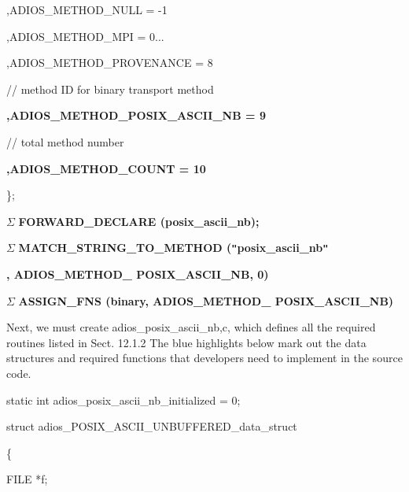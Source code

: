 \vspace{10pt}
\parindent=75pt
,ADIOS\_METHOD\_NULL                 = -1

\vspace{10pt}
,ADIOS\_METHOD\_MPI                    = 0...

\vspace{23pt}
\parindent=226pt
,ADIOS\_METHOD\_PROVENANCE  = 8

\vspace{10pt}
\parindent=0pt
// method ID for binary transport method

\vspace{10pt}
\parindent=75pt
\textbf{,ADIOS\_METHOD\_POSIX\_ASCII\_NB  = 9 }

\vspace{10pt}
// total method number

\vspace{10pt}
\textbf{,ADIOS\_METHOD\_COUNT  = 10 }

\vspace{10pt}
\};

\vspace{10pt}
\parindent=0pt
\ensuremath{\Sigma} \textbf{FORWARD\_DECLARE (posix\_ascii\_nb);}

\vspace{23pt}
\ensuremath{\Sigma} \textbf{MATCH\_STRING\_TO\_METHOD (\texttt{"}posix\_ascii\_nb\texttt{"}}

\vspace{10pt}
\textbf{, ADIOS\_METHOD\_ POSIX\_ASCII\_NB, 0)}

\vspace{10pt}
\ensuremath{\Sigma} \textbf{ASSIGN\_FNS (binary, ADIOS\_METHOD\_ POSIX\_ASCII\_NB)}

\vspace{10pt}
Next, we must create adios\_posix\_ascii\_nb,c, which defines all the required 
routines listed in Sect. 12.1.2 The blue highlights below mark out the data structures 
and required functions that developers need to implement in the source code. 

\vspace{23pt}
static int adios\_posix\_ascii\_nb\_initialized{\color{color02}  }= 0;

\vspace{10pt}
struct {\color{color02} adios\_POSIX\_ASCII\_UNBUFFERED\_data\_struct }

\vspace{10pt}
\{

\vspace{10pt}
\parindent=14pt
FILE *f;

